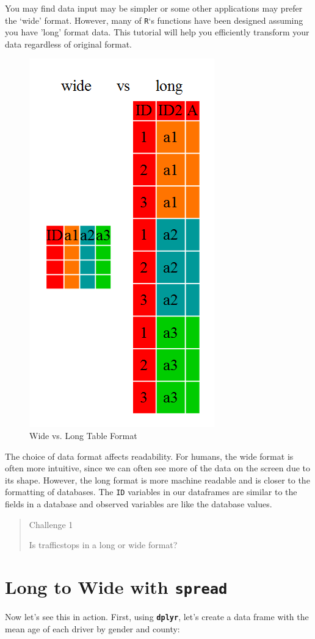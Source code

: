 \documentclass[]{book}
\begin{document}
You may find data input may be simpler or some other
applications may prefer the `wide' format. However, many of \texttt{R}`s functions have
been designed assuming you have 'long' format data. This tutorial will help you
efficiently transform your data regardless of original format.

\begin{figure}
\includegraphics[width=0.3\linewidth]{img/wide-vs-long} \caption{Wide vs. Long Table Format}\label{fig:wide-vs-long}
\end{figure}

The choice of data format affects readability. For humans, the wide format is often more intuitive, since we can often see more of the data on the screen due to its shape. However, the long format is more machine readable and is closer to the formatting of databases. The \texttt{ID} variables in our dataframes are similar to the fields in a database and observed variables are like the database values.

\begin{quote}
Challenge 1

Is trafficstops in a long or wide format?
\end{quote}

\hypertarget{long-to-wide-with-spread}{%
\section{\texorpdfstring{Long to Wide with \texttt{spread}}{Long to Wide with spread}}\label{long-to-wide-with-spread}}

Now let's see this in action. First, using \textbf{\texttt{dplyr}}, let's create a data frame
with the mean age of each driver by gender and county:
\end{document}
